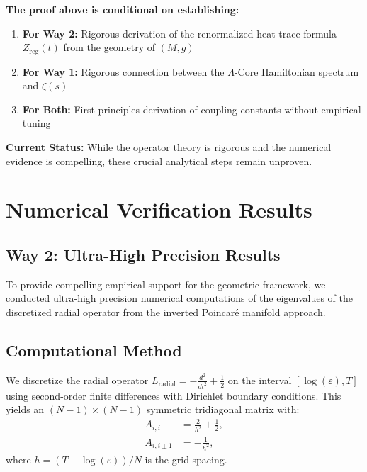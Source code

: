 \documentclass[12pt]{article}
\begin{document}
\textbf{The proof above is conditional on establishing:}

\begin{enumerate}
\item \textbf{For Way 2:} Rigorous derivation of the renormalized heat trace formula $Z_{\text{reg}}(t)$ from the geometry of $(M, g)$
\item \textbf{For Way 1:} Rigorous connection between the $\Lambda$-Core Hamiltonian spectrum and $\zeta(s)$
\item \textbf{For Both:} First-principles derivation of coupling constants without empirical tuning
\end{enumerate}

\textbf{Current Status:} While the operator theory is rigorous and the numerical evidence is compelling, these crucial analytical steps remain unproven.

\section{Numerical Verification Results}

\subsection{Way 2: Ultra-High Precision Results}

To provide compelling empirical support for the geometric framework, we conducted ultra-high precision numerical computations of the eigenvalues of the discretized radial operator from the inverted Poincaré manifold approach.

\subsection{Computational Method}

We discretize the radial operator $L_{\text{radial}} = -\frac{d^2}{dt^2} + \frac{1}{2}$ on the interval $[\log(\varepsilon), T]$ using second-order finite differences with Dirichlet boundary conditions. This yields an $(N-1) \times (N-1)$ symmetric tridiagonal matrix with:
\begin{align}
A_{i,i} &= \frac{2}{h^2} + \frac{1}{2}, \\
A_{i,i \pm 1} &= -\frac{1}{h^2},
\end{align}
where $h = (T - \log(\varepsilon))/N$ is the grid spacing.
\end{document}
